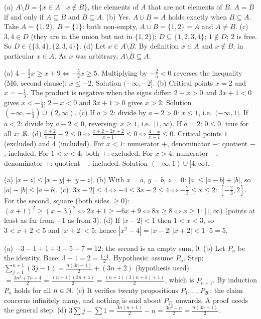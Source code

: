 (a) $A\setminus B=\{x\in A\mid x\notin B\}$, the elements of $A$ that are not elements of $B$. $A=B$ if and only if
$A\subseteq B$ and $B\subseteq A$.
(b) Yes. $A\cup B=A$ holds exactly when $B\subseteq A$. Take $A=\{1,2\}$, $B=\{1\}$: both non-empty, $A\cup B=\{1,2\}=A$ and
$A\ne B$.
(c) $3,4\in D$ (they are in the union but not in $\{1,2\}$); $D\subseteq\{1,2,3,4\}$; $1\notin D$; $2$ is free. So
$D\in\{\{3,4\},\{2,3,4\}\}$.
(d) Let $x\in A\setminus B$. By definition $x\in A$ and $x\notin B$; in particular $x\in A$. As $x$ was arbitrary,
$A\setminus B\subseteq A$.

(a) $4-\tfrac32x\ge x+9\Leftrightarrow-\tfrac52x\ge5$. Multiplying by $-\tfrac25<0$ reverses the inequality (M6, second
clause): $x\le-2$. Solution $(-\infty,-2]$.
(b) Critical points $x=2$ and $x=-\tfrac13$. The product is negative when the signs differ: $2-x>0$ and $3x+1<0$ gives
$x<-\tfrac13$; $2-x<0$ and $3x+1>0$ gives $x>2$. Solution $(-\infty,-\tfrac13)\cup(2,\infty)$.
(c) If $a>2$: divide by $a-2>0$: $x\le1$, i.e.\ $(-\infty,1]$. If $a<2$: divide by $a-2<0$, reversing: $x\ge1$, i.e.\
$[1,\infty)$. If $a=2$: $0\le0$, true for all $x$: $\mathbb{R}$.
(d) $\frac{x+2}{x-1}-2\le0\Leftrightarrow\frac{x+2-2x+2}{x-1}\le0\Leftrightarrow\frac{4-x}{x-1}\le0$. Critical points $1$ (excluded)
and $4$ (included). For $x<1$: numerator $+$, denominator $-$: quotient $-$, included. For $1<x<4$: both $+$: excluded. For
$x>4$: numerator $-$, denominator $+$: quotient $-$, included. Solution $(-\infty,1)\cup[4,\infty)$.

(a) $|x-z|\le|x-y|+|y-z|$.
(b) With $x=a$, $y=b$, $z=0$: $|a|\le|a-b|+|b|$, so $|a|-|b|\le|a-b|$.
(c) $|3x-2|\le4\Leftrightarrow-4\le3x-2\le4\Leftrightarrow-\tfrac23\le x\le2$: $[-\tfrac23,2]$. For the second, square (both sides
$\ge0$): $(x+1)^2\ge(x-3)^2\Leftrightarrow2x+1\ge-6x+9\Leftrightarrow8x\ge8\Leftrightarrow x\ge1$: $[1,\infty)$ (points at least as far
from $-1$ as from $3$).
(d) If $|x-2|<1$ then $1<x<3$, so $3<x+2<5$ and $|x+2|<5$; hence $|x^2-4|=|x-2|\,|x+2|<1\cdot5=5$.

(a) $-3-1+1+3+5+7=12$; the second is an empty sum, $0$.
(b) Let $P_n$ be the identity. Base: $3-1=2=\frac{1\cdot4}{2}$. Hypothesis: assume $P_n$. Step:
$\sum_{j=1}^{n+1}(3j-1)=\frac{n(3n+1)}2+(3n+2)$ (hypothesis used) $=\frac{3n^2+7n+4}{2}=\frac{(n+1)(3n+4)}{2}=\frac{(n+1)(3(n+1)+1)}{2}$,
which is $P_{n+1}$. By induction $P_n$ holds for all $n\in\mathbb{N}$.
(c) It verifies twenty propositions $P_1,\dots,P_{20}$; the claim concerns infinitely many, and nothing is said about
$P_{21}$ onwards. A proof needs the general step.
(d) $3\sum j-\sum1=\frac{3n(n+1)}2-n=\frac{3n^2+n}{2}=\frac{n(3n+1)}2$.

